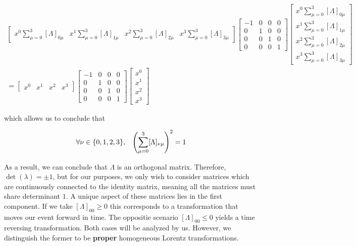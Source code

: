 \begin{equation}
\begin{aligned}
	\begin{bmatrix}
		x^0\sum_{\mu=0}^3 [\Lambda]_{0\mu}&
		x^1\sum_{\mu=0}^3 [\Lambda]_{1\mu}&
		x^2\sum_{\mu=0}^3 [\Lambda]_{2\mu}&
		x^3\sum_{\mu=0}^3 [\Lambda]_{3\mu}
	\end{bmatrix}
	\begin{bmatrix}
	-1 & 0 & 0 & 0\\
	 0 & 1 & 0 & 0\\
	0 & 0 & 1 & 0\\
	0 & 0 & 0 & 1
	\end{bmatrix}
	\begin{bmatrix}
		x^0\sum_{\mu=0}^3 [\Lambda]_{0\mu}\\
		x^1\sum_{\mu=0}^3 [\Lambda]_{1\mu}\\
		x^2\sum_{\mu=0}^3 [\Lambda]_{2\mu}\\
		x^3\sum_{\mu=0}^3 [\Lambda]_{3\mu}
	\end{bmatrix}
	\\=
	\begin{bmatrix}
		x^0&
		x^1&
		x^2&
		x^3
	\end{bmatrix}
	\begin{bmatrix}
	-1 & 0 & 0 & 0\\
	 0 & 1 & 0 & 0\\
	0 & 0 & 1 & 0\\
	0 & 0 & 0 & 1
	\end{bmatrix}
	\begin{bmatrix}
		x^0\\
		x^1\\
		x^2\\
		x^3
	\end{bmatrix}
\end{aligned}
\end{equation}

which allows us to conclude that 

\begin{equation}
\begin{aligned}
	\forall \nu \in \{0,1,2,3\},\hspace{3mm} \left(\sum_{\mu=0}^3[\Lambda]_{\nu\mu}\right)^2 = 1
\end{aligned}
\end{equation}

As a result, we can conclude that $\Lambda$ is an orthogonal matrix. Therefore, $\det(\lambda) = \pm 1$, but for our purposes, we only wish to consider matrices which are continuously connected to the identity matrix, meaning all the matrices must share determinant $1$. A unique aspect of these matrices lies in the first component. If we take $[\Lambda]_{00}\geq 0$ this corresponds to a transformation that moves our event forward in time. The oppositie scenario $[\Lambda]_{00}\leq 0$ yields a time reversing transformation. Both cases will be analyzed by us. However, we distinguish the former to be \textbf{proper} homogeneous Lorentz transformations.

